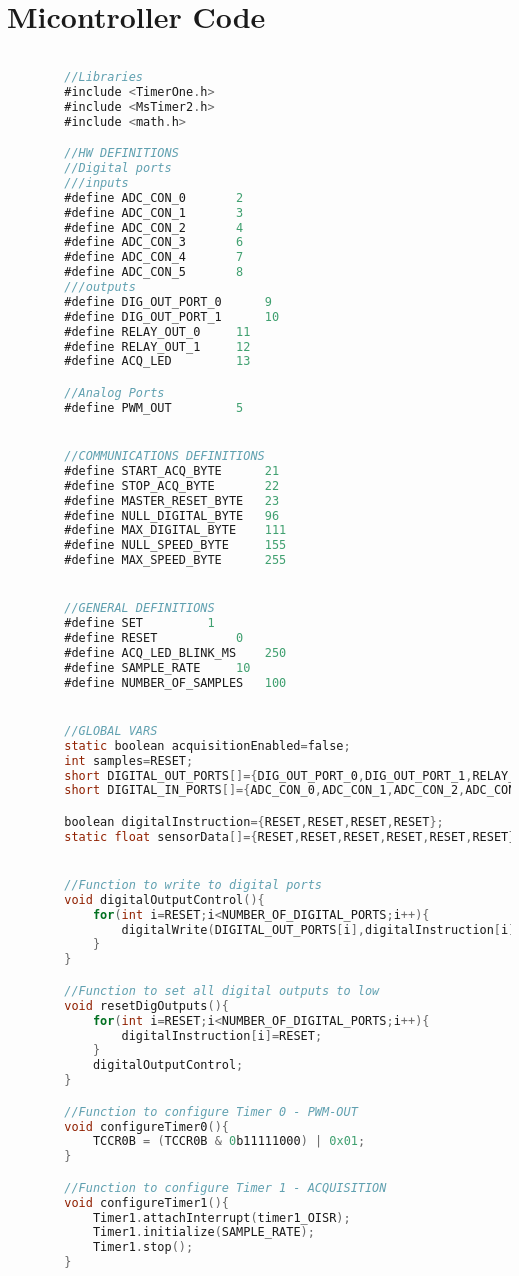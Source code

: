 \section{Micontroller Code}\label{app:microCode}

	\begin{lstlisting}[language=C]
	
		//Libraries
		#include <TimerOne.h>
		#include <MsTimer2.h>
		#include <math.h>

		//HW DEFINITIONS
		//Digital ports
		///inputs
		#define	ADC_CON_0		2
		#define	ADC_CON_1		3
		#define	ADC_CON_2		4
		#define	ADC_CON_3		6
		#define	ADC_CON_4		7
		#define	ADC_CON_5		8
		///outputs
		#define DIG_OUT_PORT_0		9
		#define	DIG_OUT_PORT_1		10
		#define RELAY_OUT_0		11
		#define RELAY_OUT_1		12
		#define	ACQ_LED			13

		//Analog Ports
		#define	PWM_OUT			5


		//COMMUNICATIONS DEFINITIONS
		#define START_ACQ_BYTE		21
		#define	STOP_ACQ_BYTE		22
		#define MASTER_RESET_BYTE	23
		#define NULL_DIGITAL_BYTE	96
		#define MAX_DIGITAL_BYTE	111
		#define NULL_SPEED_BYTE		155
		#define MAX_SPEED_BYTE		255


		//GENERAL DEFINITIONS
		#define SET			1
		#define RESET			0
		#define ACQ_LED_BLINK_MS	250
		#define SAMPLE_RATE		10
		#define NUMBER_OF_SAMPLES	100


		//GLOBAL VARS
		static boolean acquisitionEnabled=false;
		int samples=RESET;
		short DIGITAL_OUT_PORTS[]={DIG_OUT_PORT_0,DIG_OUT_PORT_1,RELAY_OUT_0,RELAY_OUT_1};
		short DIGITAL_IN_PORTS[]={ADC_CON_0,ADC_CON_1,ADC_CON_2,ADC_CON_3,ADC_CON_4,ADC_CON_5};

		boolean digitalInstruction={RESET,RESET,RESET,RESET};
		static float sensorData[]={RESET,RESET,RESET,RESET,RESET,RESET};


		//Function to write to digital ports
		void digitalOutputControl(){
			for(int i=RESET;i<NUMBER_OF_DIGITAL_PORTS;i++){
				digitalWrite(DIGITAL_OUT_PORTS[i],digitalInstruction[i])
			}
		}

		//Function to set all digital outputs to low
		void resetDigOutputs(){
			for(int i=RESET;i<NUMBER_OF_DIGITAL_PORTS;i++){
				digitalInstruction[i]=RESET;
			}
			digitalOutputControl;
		}

		//Function to configure Timer 0 - PWM-OUT
		void configureTimer0(){
			TCCR0B = (TCCR0B & 0b11111000) | 0x01;
		}

		//Function to configure Timer 1 - ACQUISITION 
		void configureTimer1(){
			Timer1.attachInterrupt(timer1_OISR);
			Timer1.initialize(SAMPLE_RATE);
			Timer1.stop();
		}


\end{lstlisting}
